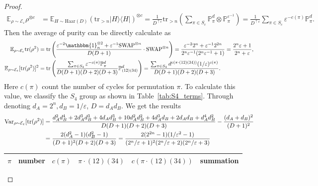 \documentclass[aps,%
twocolumn,%
floatfix,%
pra,%
amsfonts,%
groupedaddress,%
superscriptaddress]{revtex4-2}%
\newcommand{\bra}[1]{\langle #1\rvert}
\newcommand{\ket}[1]{\lvert #1\rangle}
\newcommand{\1}{\mathbbm{1}}
\begin{document}
\begin{proof}
    \begin{align}
        \mathbb{E}_{\rho \sim \mathcal{E}_{\varepsilon}}\rho^{\otimes c}&=\mathbb{E}_{H \sim \mathrm{Haar}(D)}(\text{tr}_{>n} \ket{H}\!\bra{H})^{\otimes c} = \frac{1}{D^{\uparrow c}}\mathrm{tr}_{>n}(\sum_{\pi \in S_c} \mathbb{P}_{\pi}^{d} \otimes \mathbb{P}_{\pi}^{\varepsilon^{-1}})=\frac{1}{D^{\uparrow c}}\sum_{\pi \in S_c} \varepsilon^{-c(\pi)}\mathbb{P}_{\pi}^{d}.
    \end{align}
    Then the average of purity can be directly calculate as
    \begin{align}
    \mathbb{E}_{\rho \sim \mathcal{E}_{\varepsilon}} \mathrm{tr}(\rho^2)
    &=\mathrm{tr}\left(\frac{\varepsilon^{-2} \1_{n}^{\otimes 2}+\varepsilon^{-1} \mathrm{SWAP}^{\otimes n}}{D(D+1)} \cdot \mathrm{SWAP}^{\otimes n}\right) = \frac{\varepsilon^{-2} 2^n + \varepsilon^{-1} 2^{2n}}{2^n\varepsilon^{-1}(2^n \varepsilon^{-1}+1)}= \frac{2^n\varepsilon + 1}{2^n + \varepsilon},\\
    \mathbb{E}_{\rho \sim \mathcal{E}_{\varepsilon}} [\mathrm{tr}(\rho^2)]^2&=\mathrm{tr}\left(\frac{ \sum_{\pi \in S_4}{\varepsilon^{-c(\pi)}\mathbb{P}_{\pi}^{d}}}{D(D+1)(D+2)(D+3)}\mathbb{P}_{(12)(34)}^{d}\right)=\frac{\sum_{\pi \in S_4}d^{c(\pi \cdot (12)(34))}(1/\varepsilon)^{c(\pi)}}{D(D+1)(D+2)(D+3)}.
    \end{align}
    Here $c(\pi)$ count the number of cycles for permutation $\pi$. To calculate this value, we classify the $S_4$ group as shown in Table~\ref{tab:S4_terms}. 
    Through denoting $d_A = 2^n, d_B = 1 / \varepsilon$, $D = d_Ad_B$. We get the results
    \begin{align}
        \mathrm{Var}_{\rho \sim \mathcal{E}_{\varepsilon}} [\mathrm{tr}(\rho^2)] &= \frac{d_A^2 d_B^4+2 d_A^3 d_B^3+4 d_A d_B^3+10 d_A^2 d_B^2+4 d_A^3 d_B+2 d_A d_B+d_A^4 d_B^2}{D(D+1)(D+2)(D+3)} - \frac{(d_A + d_B)^2}{(D+1)^2}\notag\\
        &= \frac{2(d_A^2-1)(d_B^2-1)}{(D + 1)^2 (D+2)(D+3)} = \frac{2(2^{2n}-1)(1/\varepsilon^2-1)}{(2^n/\varepsilon + 1)^2 (2^n/\varepsilon+2)(2^n/\varepsilon+3)}
    \end{align} 
    \begin{table}[htbp!]
        \centering
        \begin{tabular}{|l|c|c|l|c|l|}
        \hline
        \textbf{$\pi$} & \textbf{number} & \textbf{$c(\pi)$} & \textbf{$\pi \cdot (12)(34)$} & \textbf{$c(\pi \cdot (12)(34))$} & \textbf{summation} \\ \hline

\end{tabular}
\end{table}
\end{proof}
\end{document}
